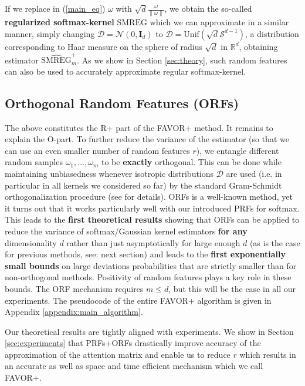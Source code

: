 If we replace in (\ref{main_eq}) $\omega$ with $\sqrt{d}\frac{\omega}{\|\omega\|}$, we obtain the so-called \textbf{regularized softmax-kernel} $\mathrm{SMREG}$ which we can approximate in a similar manner, simply changing $\mathcal{D}=\mathcal{N}(0,\mathbf{I}_{d})$ to $\mathcal{D} = \mathrm{Unif}(\sqrt{d}\mathcal{S}^{d-1})$, a distribution corresponding to Haar measure on the sphere of radius $\sqrt{d}$ in $\mathbb{R}^{d}$, obtaining estimator $\widehat{\mathrm{SMREG}}^{+}_{m}$. As we show in Section \ref{sec:theory}, such random features can also be used to accurately approximate regular softmax-kernel.

\subsection{Orthogonal Random Features (ORFs)}
The above constitutes the R+ part of the FAVOR+ method. It remains to explain the O-part. To further reduce the variance of the estimator (so that we can use an even smaller number of random features $r$), we entangle different random samples $\omega_{1},...,\omega_{m}$ to be \textbf{exactly} orthogonal. This can be done while maintaining unbiasedness whenever isotropic distributions $\mathcal{D}$ are used (i.e. in particular in all kernels we considered so far) by the standard Gram-Schmidt orthogonalization procedure (see \citep{unreas} for details). ORFs is a well-known method, yet it turns out that it works particularly well with our introduced PRFs for softmax. This leads to the \textbf{first theoretical results} showing that ORFs can be applied to reduce the variance of softmax/Gaussian kernel estimators \textbf{for any} dimensionality $d$ rather than just asymptotically for large enough $d$ (as is the case for previous methods, see: next section) and leads to the \textbf{first exponentially small bounds} on large deviations probabilities that are strictly smaller than for non-orthogonal methods. Positivity of random features plays a key role in these bounds. The ORF mechanism requires $m \leq d$, but this will be the case in all our experiments. The pseudocode of the entire FAVOR+ algorithm is given in Appendix \ref{appendix:main_algorithm}.

Our theoretical results are tightly aligned with experiments. We show in Section \ref{sec:experiments} that PRFs+ORFs drastically improve accuracy of the approximation of the attention matrix and enable us to reduce $r$ which results in an accurate as well as space and time efficient mechanism which we call FAVOR+.



